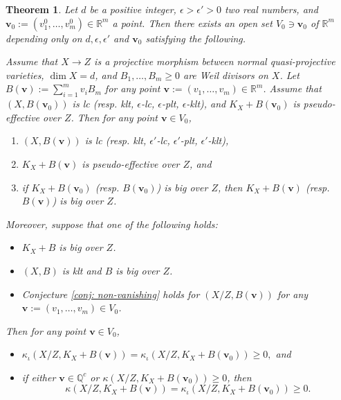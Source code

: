 \documentclass[11pt]{amsart}
\numberwithin{equation}{section}
\newcommand{\Qq}{\mathbb{Q}}
\newcommand{\Rr}{\mathbb{R}}
\newtheorem{thm}{Theorem}[section]
\theoremstyle{definition}
\theoremstyle{definition}
\begin{document}
\begin{thm}\label{thm: Uniform kod polytope assume gmm intro1}
Let $d$ be a positive integer, $\epsilon>\epsilon'>0$ two real numbers, and $\bm{v}_0:=(v_1^0,\dots,v_m^0)\in\Rr^m$ a point. Then there exists an open set $V_0\ni\bm{v}_0$ of $\Rr^m$ depending only on $d,\epsilon,\epsilon'$ and $\bm{v}_0$ satisfying the following. 

Assume that $X\rightarrow Z$ is a projective morphism between normal quasi-projective varieties,  $\dim X=d$, and $B_1,\dots,B_m\geq 0$ are Weil divisors on $X$. Let $B(\bm{v}):=\sum_{i=1}^mv_iB_m$ for any point $\bm{v}:=(v_1,\dots,v_m)\in\Rr^m$. Assume that $(X,B(\bm{v}_0))$ is lc (resp. klt, $\epsilon$-lc, $\epsilon$-plt, $\epsilon$-klt), and $K_X+B(\bm{v}_0)$ is pseudo-effective over $Z$. Then for any point $\bm{v}\in V_0$,
\begin{enumerate}
     \item $(X,B(\bm{v}))$ is lc (resp. klt, $\epsilon'$-lc, $\epsilon'$-plt, $\epsilon'$-klt),
     \item $K_X+B(\bm{v})$ is pseudo-effective over $Z$, and
    \item if $K_X+B(\bm{v}_0)$ (resp. $B(\bm{v}_0)$) is big over $Z$, then $K_X+B(\bm{v})$ (resp. $B(\bm{v})$) is big over $Z$.
\end{enumerate}
Moreover, suppose that one of the following holds:
\begin{itemize}
  \item $K_X+B$ is big over $Z$.
  \item $(X,B)$ is klt and $B$ is big over $Z$.
  \item Conjecture \ref{conj: non-vanishing} holds for $(X/Z,B(\bm{v}))$ for any $\bm{v}:=(v_1,\dots,v_m)\in V_0$.
\end{itemize}
Then for any point $\bm{v}\in V_0$, 
\begin{itemize}
    \item[(4)] $\kappa_{\iota}(X/Z,K_X+B(\bm{v}))=\kappa_{\iota}(X/Z,K_X+B(\bm{v}_0))\geq 0,$ and
    \item[(5)] if either $\bm{v}\in \Qq^c$ or $\kappa(X/Z,K_X+B(\bm{v}_0))\geq 0$, then 
    $$\kappa(X/Z,K_X+B(\bm{v}))=\kappa_{\iota}(X/Z,K_X+B(\bm{v}_0))\geq 0.$$
\end{itemize}
\end{thm}
\end{document}
